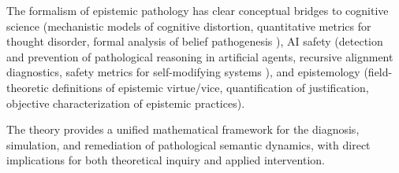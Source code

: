 The formalism of epistemic pathology has clear conceptual bridges to cognitive science (mechanistic models of cognitive distortion, quantitative metrics for thought disorder, formal analysis of belief pathogenesis \autocite{Crick1990, Dehaene2014}), AI safety (detection and prevention of pathological reasoning in artificial agents, recursive alignment diagnostics, safety metrics for self-modifying systems \autocite{RussellDeweyTegmark2016}), and epistemology (field-theoretic definitions of epistemic virtue/vice, quantification of justification, objective characterization of epistemic practices).

The theory provides a unified mathematical framework for the diagnosis, simulation, and remediation of pathological semantic dynamics, with direct implications for both theoretical inquiry and applied intervention. 